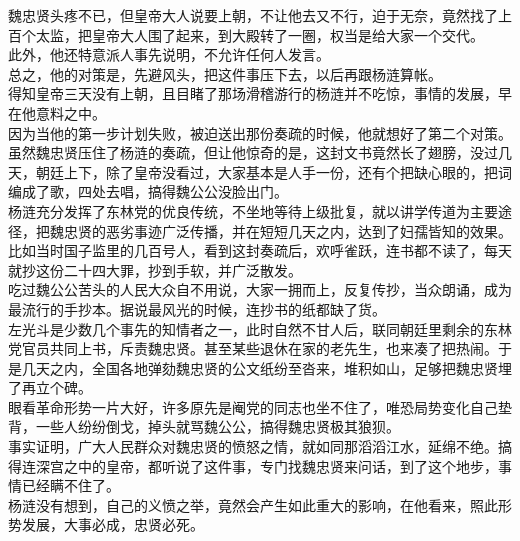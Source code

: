 \begin{multicols}{\theparacolNo}
魏忠贤头疼不已，但皇帝大人说要上朝，不让他去又不行，迫于无奈，竟然找了上百个太监，把皇帝大人围了起来，到大殿转了一圈，权当是给大家一个交代。\\

此外，他还特意派人事先说明，不允许任何人发言。\\

总之，他的对策是，先避风头，把这件事压下去，以后再跟杨涟算帐。\\

得知皇帝三天没有上朝，且目睹了那场滑稽游行的杨涟并不吃惊，事情的发展，早在他意料之中。\\

因为当他的第一步计划失败，被迫送出那份奏疏的时候，他就想好了第二个对策。\\

虽然魏忠贤压住了杨涟的奏疏，但让他惊奇的是，这封文书竟然长了翅膀，没过几天，朝廷上下，除了皇帝没看过，大家基本是人手一份，还有个把缺心眼的，把词编成了歌，四处去唱，搞得魏公公没脸出门。\\

杨涟充分发挥了东林党的优良传统，不坐地等待上级批复，就以讲学传道为主要途径，把魏忠贤的恶劣事迹广泛传播，并在短短几天之内，达到了妇孺皆知的效果。\\

比如当时国子监里的几百号人，看到这封奏疏后，欢呼雀跃，连书都不读了，每天就抄这份二十四大罪，抄到手软，并广泛散发。\\

吃过魏公公苦头的人民大众自不用说，大家一拥而上，反复传抄，当众朗诵，成为最流行的手抄本。据说最风光的时候，连抄书的纸都缺了货。\\

左光斗是少数几个事先的知情者之一，此时自然不甘人后，联同朝廷里剩余的东林党官员共同上书，斥责魏忠贤。甚至某些退休在家的老先生，也来凑了把热闹。于是几天之内，全国各地弹劾魏忠贤的公文纸纷至沓来，堆积如山，足够把魏忠贤埋了再立个碑。\\

眼看革命形势一片大好，许多原先是阉党的同志也坐不住了，唯恐局势变化自己垫背，一些人纷纷倒戈，掉头就骂魏公公，搞得魏忠贤极其狼狈。\\

事实证明，广大人民群众对魏忠贤的愤怒之情，就如同那滔滔江水，延绵不绝。搞得连深宫之中的皇帝，都听说了这件事，专门找魏忠贤来问话，到了这个地步，事情已经瞒不住了。\\

杨涟没有想到，自己的义愤之举，竟然会产生如此重大的影响，在他看来，照此形势发展，大事必成，忠贤必死。\\


\end{multicols}

